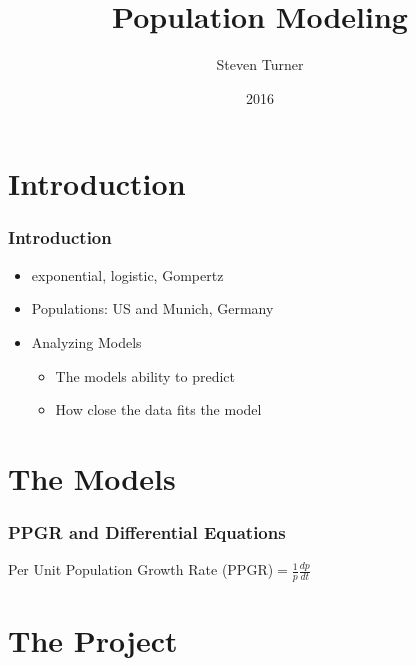 \documentclass[11pt,letterpaper]{beamer}
\author{Steven Turner}
\title{Population Modeling}
\date{2016}
\begin{document}
	\frame{\titlepage}
\section{Introduction}
	\begin{frame}
		\frametitle{Introduction}
		\begin{itemize}
			\item exponential, logistic, Gompertz 
			\item Populations: US and Munich, Germany
			\item Analyzing Models
			\begin{itemize}
				\item The models ability to predict
				\item How close the data fits the model
			\end{itemize}
		\end{itemize}
	\end{frame}
	
\section{The Models}

	\begin{frame}
	\frametitle{PPGR and Differential Equations}
	Per Unit Population Growth Rate (PPGR)$ =\frac{1}{p}\frac{dp}{dt} $\\
	\begin{table}
	\end{table}
	\end{frame}


\section{The Project}
\end{document}
